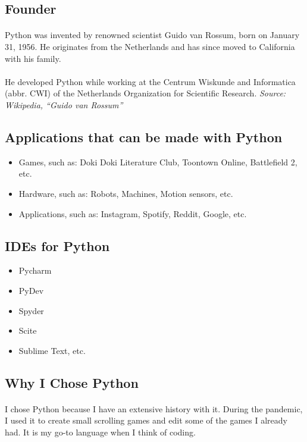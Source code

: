 \documentclass{article}
\begin{document}
	\subsection{Founder}
	\paragraph{}Python was invented by renowned scientist Guido van Rossum, born on January 31, 1956.
	He originates from the Netherlands and has since moved to California with his family.
	\paragraph{}He developed Python while working at the Centrum Wiskunde and Informatica (abbr. CWI) of the Netherlands Organization for Scientific Research.
	\textit{Source: Wikipedia, “Guido van Rossum”}
	\subsection{Applications that can be made with Python}
	\begin{itemize}
		\item Games, such as: Doki Doki Literature Club, Toontown Online, Battlefield 2, etc.
		\item Hardware, such as: Robots, Machines, Motion sensors, etc.
		\item Applications, such as: Instagram, Spotify, Reddit, Google, etc.
	\end{itemize}
	\subsection{IDEs for Python}
	\begin{itemize}
		\item Pycharm
		\item PyDev
		\item Spyder
		\item Scite
		\item Sublime Text, etc.
	\end{itemize}
	\subsection{Why I Chose Python}
	\paragraph{}I chose Python because I have an extensive history with it.
	During the pandemic, I used it to create small scrolling games and edit some of the games I already had.
	It is my go-to language when I think of coding.
\end{document}
